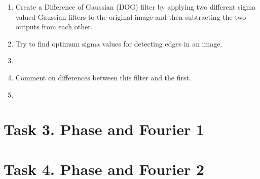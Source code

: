 \documentclass[12pt,english]{scrartcl}
\begin{document}
\begin{enumerate}
 \color{black}
 \item Create a Difference of Gaussian (DOG) filter by applying two different sigma valued Gaussian  filters to the original image and then subtracting the two outputs from each other. \\ 

 \color{black}
 \item Try to find optimum sigma values for detecting edges in an image. \\
 \item[]

 \color{black}
 \item Comment on differences between this filter and the first. \\
 \item[]

\end{enumerate}

\section*{Task 3. Phase and Fourier 1}

\section*{Task 4. Phase and Fourier 2}

 
\end{document}
